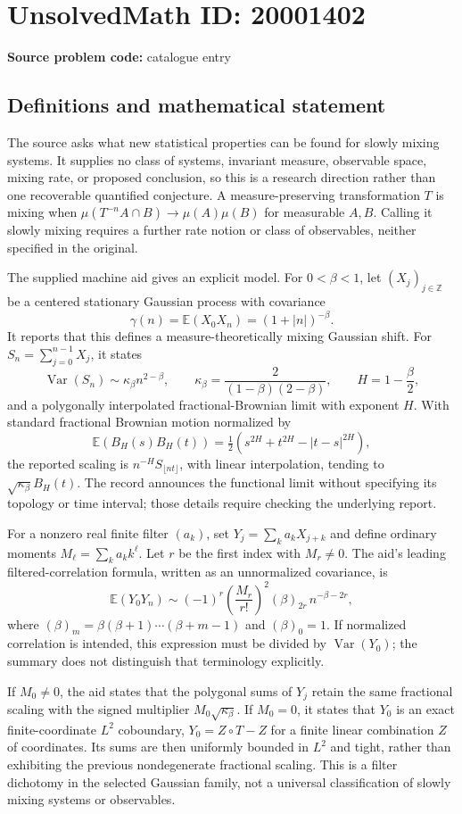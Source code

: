 \documentclass[11pt]{article}
\newcommand{\Z}{\mathbb{Z}}
\newcommand{\E}{\mathbb{E}}
\begin{document}
\section*{UnsolvedMath ID: 20001402}
\textbf{Source problem code:} catalogue entry
\subsection{Definitions and mathematical statement}
The source asks what new statistical properties can be found for slowly mixing systems. It supplies no class of systems, invariant measure, observable space, mixing rate, or proposed conclusion, so this is a research direction rather than one recoverable quantified conjecture. A measure-preserving transformation $T$ is mixing when $\mu(T^{-n}A\cap B)\to\mu(A)\mu(B)$ for measurable $A,B$. Calling it slowly mixing requires a further rate notion or class of observables, neither specified in the original.

The supplied machine aid gives an explicit model. For $0<\beta<1$, let $(X_j)_{j\in\Z}$ be a centered stationary Gaussian process with covariance
\[
 \gamma(n)=\E(X_0X_n)=(1+|n|)^{-\beta}.
\]
It reports that this defines a measure-theoretically mixing Gaussian shift. For $S_n=\sum_{j=0}^{n-1}X_j$, it states
\[
 \operatorname{Var}(S_n)\sim\kappa_\beta n^{2-\beta},
 \qquad\kappa_\beta=\frac{2}{(1-\beta)(2-\beta)},\qquad H=1-\frac\beta2,
\]
and a polygonally interpolated fractional-Brownian limit with exponent $H$. With standard fractional Brownian motion normalized by
\[
 \E(B_H(s)B_H(t))=\tfrac12(s^{2H}+t^{2H}-|t-s|^{2H}),
\]
the reported scaling is $n^{-H}S_{\lfloor nt\rfloor}$, with linear interpolation, tending to $\sqrt{\kappa_\beta}B_H(t)$. The record announces the functional limit without specifying its topology or time interval; those details require checking the underlying report.

For a nonzero real finite filter $(a_k)$, set $Y_j=\sum_k a_kX_{j+k}$ and define ordinary moments $M_\ell=\sum_k a_k k^\ell$. Let $r$ be the first index with $M_r\ne0$. The aid's leading filtered-correlation formula, written as an unnormalized covariance, is
\[
 \E(Y_0Y_n)\sim(-1)^r\left(\frac{M_r}{r!}\right)^2
 (\beta)_{2r}\,n^{-\beta-2r},
\]
where $(\beta)_m=\beta(\beta+1)\cdots(\beta+m-1)$ and $(\beta)_0=1$. If normalized correlation is intended, this expression must be divided by $\operatorname{Var}(Y_0)$; the summary does not distinguish that terminology explicitly.

If $M_0\ne0$, the aid states that the polygonal sums of $Y_j$ retain the same fractional scaling with the signed multiplier $M_0\sqrt{\kappa_\beta}$. If $M_0=0$, it states that $Y_0$ is an exact finite-coordinate $L^2$ coboundary, $Y_0=Z\circ T-Z$ for a finite linear combination $Z$ of coordinates. Its sums are then uniformly bounded in $L^2$ and tight, rather than exhibiting the previous nondegenerate fractional scaling. This is a filter dichotomy in the selected Gaussian family, not a universal classification of slowly mixing systems or observables.
\end{document}
